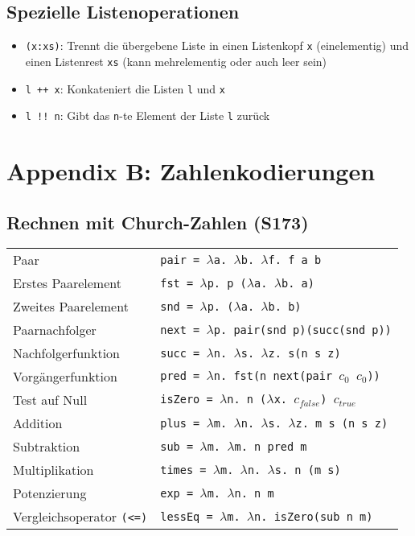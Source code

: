 \subsection{Spezielle Listenoperationen}
\begin{itemize}
	\item \texttt{(x:xs)}: Trennt die übergebene Liste in einen Listenkopf \texttt{x} (einelementig) und einen Listenrest \texttt{xs} (kann mehrelementig oder auch leer sein)
	\item \texttt{l ++ x}: Konkateniert die Listen \texttt{l} und \texttt{x}
	\item \texttt{l !! n}: Gibt das \texttt{n}-te Element der Liste \texttt{l} zurück 
\end{itemize}


\section{Appendix B: Zahlenkodierungen}

\subsection{Rechnen mit Church-Zahlen (S173)}
\begin{table}[H]
\begin{tabularx}{\textwidth}{l|X}
	Paar & \texttt{pair = \(\lambda\)a. \(\lambda\)b. \(\lambda\)f. f a b} \\
	Erstes Paarelement & \texttt{fst = \(\lambda\)p. p (\(\lambda\)a. \(\lambda\)b. a)} \\
	Zweites Paarelement & \texttt{snd = \(\lambda\)p. (\(\lambda\)a. \(\lambda\)b. b)} \\
	Paarnachfolger & \texttt{next = \(\lambda\)p. pair(snd p)(succ(snd p))} \\
	Nachfolgerfunktion & \texttt{succ = \(\lambda\)n. \(\lambda\)s. \(\lambda\)z. s(n s z)} \\
	Vorgängerfunktion & \texttt{pred = \(\lambda\)n. fst(n next(pair \(c_0\) \(c_0\)))} \\
	Test auf Null & \texttt{isZero = \(\lambda\)n. n (\(\lambda\)x. \(c_{false}\)) \(c_{true}\)} \\
	Addition & \texttt{plus = \(\lambda\)m. \(\lambda\)n. \(\lambda\)s. \(\lambda\)z. m s (n s z)} \\
	Subtraktion & \texttt{sub = \(\lambda\)m. \(\lambda\)m. n pred m} \\
	Multiplikation & \texttt{times = \(\lambda\)m. \(\lambda\)n. \(\lambda\)s. n (m s)} \\
	Potenzierung & \texttt{exp = \(\lambda\)m. \(\lambda\)n. n m} \\
	Vergleichsoperator \texttt{(<=)} & \texttt{lessEq = \(\lambda\)m. \(\lambda\)n. isZero(sub n m)} \\
\end{tabularx}
\end{table}



